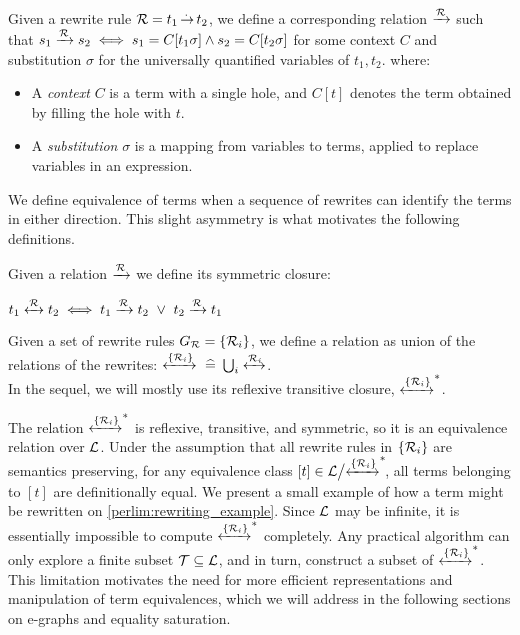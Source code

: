 \begin{definition}\label{screening:rw-equiv}
Given a rewrite rule $\mathcal{R} = t_1 \operatorname{\overset{.\,}{\rightarrow}} t_2$, we define a corresponding relation
$\xrightarrow[]{\mathcal{R}}$ such that $s_1 \xrightarrow[]{\mathcal{R}} s_2 \iff s_1=C[t_1\sigma] \land s_2=C[t_2\sigma]$
for some context $C$ and substitution $\sigma$ for the universally quantified variables of $t_1, t_2$.
where:
\begin{itemize}
    \item A \emph{context} $C$ is a term with a single hole, and $C[t]$ denotes the term obtained by filling the hole with $t$.
    \item A \emph{substitution} $\sigma$ is a mapping from variables to terms, applied to replace variables in an expression.
\end{itemize}
\end{definition}

We define equivalence of terms when a sequence of rewrites can identify the terms in either direction.
This slight asymmetry is what motivates the following definitions.

\begin{definition}\label{screening:symmetric}
Given a relation $\xrightarrow[]{\mathcal{R}}$ we define its symmetric closure:

\centering
$t_1 \xleftrightarrow[]{\mathcal{R}\,} t_2 \iff t_1 \xrightarrow[]{\mathcal{R}} t_2 ~\lor~ t_2 \xrightarrow[]{\mathcal{R}} t_1$
\end{definition}

\begin{definition}\label{screening:rw-set-equiv}
Given a set of rewrite rules $G_{\mathcal{R}}=\{\mathcal{R}_i\}$, we define a relation as union of the relations of the rewrites: $\xleftrightarrow[]{\{\mathcal{R}_i\}} \operatorname{~\widehat{=}~} \bigcup_{i}\xleftrightarrow[]{\mathcal{R}_i}$.\\
In the sequel, we will mostly use its reflexive transitive closure, $\xleftrightarrow[]{\{\mathcal{R}_i\}}^*$.
\end{definition}

The relation $\xleftrightarrow[]{\{\mathcal{R}_i\}}^*$ is reflexive, transitive, and symmetric,
so it is an equivalence relation over $\mathcal{L}$.
Under the assumption that all rewrite rules in $\{\mathcal{R}_i\}$ are semantics preserving, for any equivalence class $[t] \in \mathcal{L} \big/ {\xleftrightarrow[]{\{\mathcal{R}_i\}}^*}\!$, all terms belonging to $[t]$ are definitionally equal.
We present a small example of how a term might be rewritten on \autoref{perlim:rewriting_example}.
Since $\mathcal{L}$ may be infinite, it is essentially impossible to compute $\xleftrightarrow[]{\{\mathcal{R}_i\}}^*$ completely. 
Any practical algorithm can only explore a finite subset $\mathcal{T} \subseteq \mathcal{L}$, and in turn, construct a subset of $\xleftrightarrow[]{\{\mathcal{R}_i\}}^*$. 
This limitation motivates the need for more efficient representations and manipulation of term equivalences, which we will address in the following sections on e-graphs and equality saturation.

